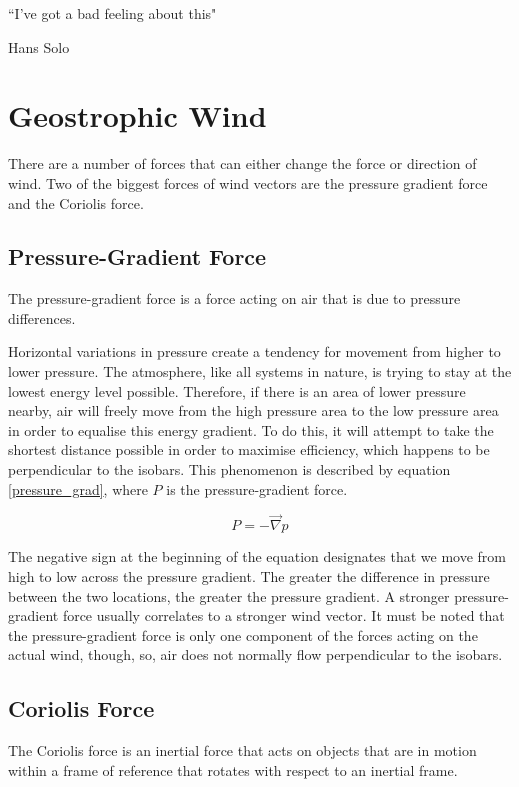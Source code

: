 \epigraph{``I've got a bad feeling about this"}{Hans Solo}

\section{Geostrophic Wind}\label{geostrophic_wind}
There are a number of forces that can either change the force or direction of wind. Two of the biggest forces of wind vectors are the pressure gradient force and the Coriolis force.

\subsection{Pressure-Gradient Force}
\begin{definition}
The pressure-gradient force is a force acting on air that is due to pressure differences.
\end{definition}

Horizontal variations in pressure create a tendency for movement from higher to lower pressure. The atmosphere, like all systems in nature, is trying to stay at the lowest energy level possible. Therefore, if there is an area of lower pressure nearby, air will freely move from the high pressure area to the low pressure area in order to equalise this energy gradient. To do this, it will attempt to take the shortest distance possible in order to maximise efficiency, which happens to be perpendicular to the isobars\cite{pressuregrad_def}. This phenomenon is described by equation \ref{pressure_grad}, where $P$ is the pressure-gradient force.

\begin{equation}
    \label{pressure_grad}
    P = - \Vec{\nabla} p
\end{equation}

The negative sign at the beginning of the equation designates that we move from high to low across the pressure gradient. The greater the difference in pressure between the two locations, the greater the pressure gradient. A stronger pressure-gradient force usually correlates to a stronger wind vector. It must be noted that the pressure-gradient force is only one component of the forces acting on the actual wind, though, so, air does not normally flow perpendicular to the isobars\cite{pressure_grad}.

\subsection{Coriolis Force}\label{f_section}
\begin{definition}
The Coriolis force is an inertial force that acts on objects that are in motion within a frame of reference that rotates with respect to an inertial frame.
\end{definition}

